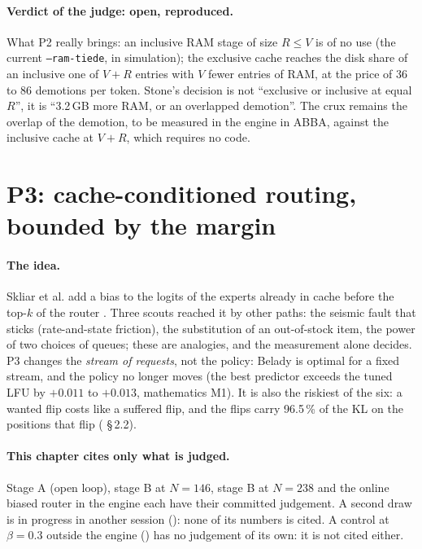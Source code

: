 \paragraph{Verdict of the judge: open, reproduced.} What P2 really brings: an inclusive RAM stage of size $R \le V$ is of no use (the current \texttt{--ram-tiede}, in simulation); the exclusive cache reaches the disk share of an inclusive one of $V+R$ entries with $V$ fewer entries of RAM, at the price of 36 to 86 demotions per token. Stone's decision is not ``exclusive or inclusive at equal $R$'', it is ``3.2\,GB more RAM, or an overlapped demotion''. The crux remains the overlap of the demotion, to be measured in the engine in ABBA, against the inclusive cache at $V+R$, which requires no code.

\section{P3: cache-conditioned routing, bounded by the margin}\label{t3mim:sec:p3}

\paragraph{The idea.} Skliar et al. add a bias to the logits of the experts already in cache before the top-$k$ of the router \cite{skliar2025cacheconditional}. Three scouts reached it by other paths: the seismic fault that sticks (rate-and-state friction), the substitution of an out-of-stock item, the power of two choices of queues; these are analogies, and the measurement alone decides. P3 changes the \emph{stream of requests}, not the policy: Belady is optimal for a fixed stream, and the policy no longer moves (the best predictor exceeds the tuned LFU by $+0.011$ to $+0.013$, mathematics M1). It is also the riskiest of the six: a wanted flip costs like a suffered flip, and the flips carry 96.5\,\% of the KL on the positions that flip ( §\,2.2).

\paragraph{This chapter cites only what is judged.} Stage A (open loop), stage B at $N = 146$, stage B at $N = 238$ and the online biased router in the engine each have their committed judgement. A second draw is in progress in another session (): none of its numbers is cited. A control at $\beta = 0.3$ outside the engine () has no judgement of its own: it is not cited either.

